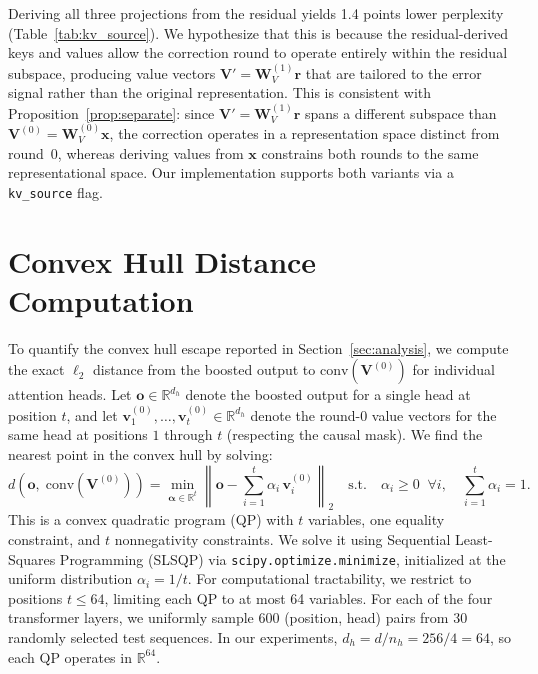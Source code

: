 \documentclass{article}
\theoremstyle{definition}
\begin{document}
Deriving all three projections from the residual yields 1.4 points lower perplexity (Table~\ref{tab:kv_source}).
We hypothesize that this is because the residual-derived keys and values allow the correction round to operate entirely within the residual subspace, producing value vectors $\mathbf{V}' = \mathbf{W}_V^{(1)}\mathbf{r}$ that are tailored to the error signal rather than the original representation.
This is consistent with Proposition~\ref{prop:separate}: since $\mathbf{V}' = \mathbf{W}_V^{(1)}\mathbf{r}$ spans a different subspace than $\mathbf{V}^{(0)} = \mathbf{W}_V^{(0)}\mathbf{x}$, the correction operates in a representation space distinct from round~0, whereas deriving values from $\mathbf{x}$ constrains both rounds to the same representational space.
Our implementation supports both variants via a \texttt{kv\_source} flag.


\section{Convex Hull Distance Computation}
\label{app:convex_hull}

To quantify the convex hull escape reported in Section~\ref{sec:analysis}, we compute the exact $\ell_2$ distance from the boosted output to $\mathrm{conv}(\mathbf{V}^{(0)})$ for individual attention heads.
Let $\mathbf{o} \in \mathbb{R}^{d_h}$ denote the boosted output for a single head at position $t$, and let $\mathbf{v}_1^{(0)}, \ldots, \mathbf{v}_t^{(0)} \in \mathbb{R}^{d_h}$ denote the round-0 value vectors for the same head at positions $1$ through $t$ (respecting the causal mask).
We find the nearest point in the convex hull by solving:
\begin{equation}
    d\!\left(\mathbf{o},\; \mathrm{conv}(\mathbf{V}^{(0)})\right) = \min_{\boldsymbol{\alpha} \in \mathbb{R}^t} \left\| \mathbf{o} - \sum_{i=1}^{t} \alpha_i \, \mathbf{v}_i^{(0)} \right\|_2 \quad \text{s.t.} \quad \alpha_i \geq 0 \;\;\forall i, \quad \sum_{i=1}^{t} \alpha_i = 1.
\end{equation}
This is a convex quadratic program (QP) with $t$ variables, one equality constraint, and $t$ nonnegativity constraints.
We solve it using Sequential Least-Squares Programming (SLSQP) via \texttt{scipy.optimize.minimize}, initialized at the uniform distribution $\alpha_i = 1/t$.
For computational tractability, we restrict to positions $t \leq 64$, limiting each QP to at most 64 variables.
For each of the four transformer layers, we uniformly sample 600 (position, head) pairs from 30 randomly selected test sequences.
In our experiments, $d_h = d / n_h = 256 / 4 = 64$, so each QP operates in $\mathbb{R}^{64}$.
\end{document}
